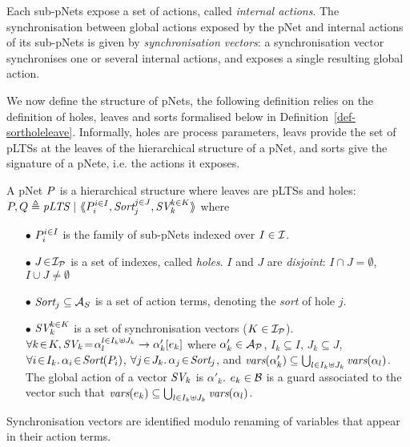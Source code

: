 \documentclass{lncs/llncs}
\begin{document}
Each sub-pNets expose
a set of actions, called \emph{internal actions}. The synchronisation between global actions exposed by the pNet and
internal actions of its sub-pNets is given by  \emph{synchronisation vectors}: a
synchronisation vector synchronises one or several internal actions, and
exposes a single resulting global action.


We now define the structure of pNets, the following definition relies on the definition 
of holes, leaves and sorts formalised below in Definition~\ref{def-sortholeleave}. Informally, holes are process parameters, leavs provide the set of pLTSs at the leaves of the hierarchical structure of a pNet, and sorts give the signature of a pNete, i.e. the actions it exposes.

\begin{definition}[pNets]\label{def-pnets}
A pNet $\pNet$ is a hierarchical structure where leaves are pLTSs and holes:\\
$\pNet,\pNetQ\triangleq \pLTS~|~\mylangle \pNet_i^{i\in I}, \Sort_j^{j\in J}, \symb{SV}_k^{k\in 
K}\myrangle$
where
\begin{itemize}
\item[$\bullet$] $\pNet_i^{i\in I}$ is the family of sub-pNets indexed over $I \in \I$.

\item[$\bullet$] $J\!\in\!\I_\P$ is a set of indexes, called \emph{holes}.
$I$ and $J$ are \emph{disjoint}: $I\!\cap\! J=\emptyset$,  $I\!\cup\! J\neq\emptyset$
\item[$\bullet$] $\Sort_j \subseteq \AlgAS$ is a set of action terms, denoting the 
\emph{sort} of
hole $j$.

\item[$\bullet$] $\symb{SV}_k^{k\in K}$ is a set of
  synchronisation vectors ($K\in\I_\P$). $\forall k\!\in\! K,
  \symb{SV}_k\!=\!\SV{\alpha_{l}^{l\in I_k \uplus J_k}}{\alpha'_k}{e_k}$ where
  $\alpha'_k\in \mathcal{A}_\P$, $I_k\subseteq I$, $J_k\subseteq J$,
  $\forall i\!\in\!
  I_k.\,\alpha_{i}\!\in\!\Sort(\pNet_i)$,  $\forall j\!\in\!
  J_k.\,\alpha_{j}\!\in\!\Sort_j$, and $\vars(\alpha'_k)\subseteq \bigcup_{l\in I_k\uplus 
  J_k}{\vars({\alpha_l})}$. The global action of a vector $\symb{SV}_k$ is
$\alpha'_k$. $e_k \in \AlgB$ is a guard associated to the vector such that
$\vars(e_k)\subseteq \bigcup_{l\in I_k\uplus J_k}{\vars({\alpha_l})}$.
\end{itemize}
Synchronisation vectors are identified modulo renaming of variables that appear in their 
action terms.
\end{definition}
\end{document}
